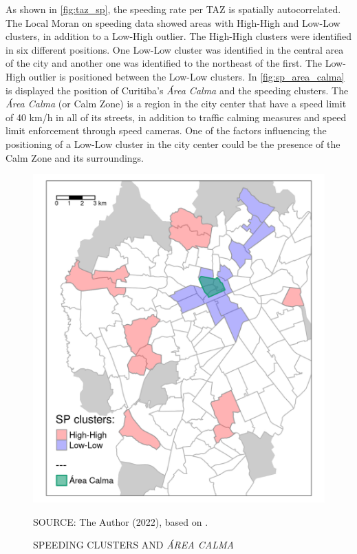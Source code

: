 

As shown in \autoref{fig:taz_sp}, the speeding rate per TAZ is spatially autocorrelated. The Local Moran on speeding data showed areas with High-High and Low-Low clusters, in addition to a Low-High outlier. The High-High clusters were identified in six different positions. One Low-Low cluster was identified in the central area of the city and another one was identified to the northeast of the first. The Low-High outlier is positioned between the Low-Low clusters. In \autoref{fig:sp_area_calma} is displayed the position of Curitiba's \textit{Área Calma} and the speeding clusters. The \textit{Área Calma} (or Calm Zone) is a region in the city center that have a speed limit of 40 km/h in all of its streets, in addition to traffic calming measures and speed limit enforcement through speed cameras. One of the factors influencing the positioning of a Low-Low cluster in the city center could be the presence of the Calm Zone and its surroundings. 

\begin{figure}[!htbp]
    \footnotesize
    \captionsetup{font=footnotesize}
    \caption{SPEEDING CLUSTERS AND \textit{ÁREA CALMA}}
    \centering
    \includegraphics{fig/sp_area_calma.png}
    \label{fig:sp_area_calma}
    \par SOURCE: The Author (2022), based on \textcite{IPPUC2021}.
\end{figure}

